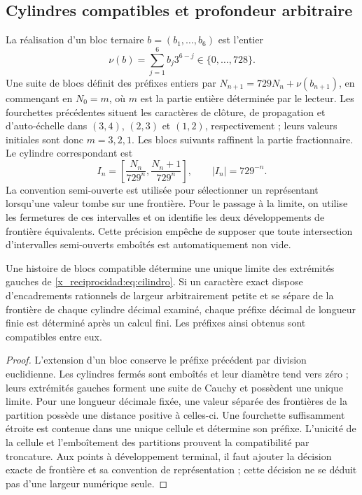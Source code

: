 

\subsection{Cylindres compatibles et profondeur arbitraire}

La réalisation d'un bloc ternaire \(b=(b_1,\ldots,b_6)\) est l'entier
\[
 \nu(b)=\sum_{j=1}^6b_j3^{6-j}\in\{0,\ldots,728\}.
\]
Une suite de blocs définit des préfixes entiers par \(N_{n+1}=729N_n+\nu(b_{n+1})\), en commençant en \(N_0=m\), où \(m\) est la partie entière déterminée par le lecteur. Les fourchettes précédentes situent les caractères de clôture, de propagation et d'auto-échelle dans \((3,4)\), \((2,3)\) et \((1,2)\), respectivement ; leurs valeurs initiales sont donc \(m=3,2,1\). Les blocs suivants raffinent la partie fractionnaire. Le cylindre correspondant est
\begin{equation}
 I_n=\left[\frac{N_n}{729^n},\frac{N_n+1}{729^n}\right],
 \qquad |I_n|=729^{-n}.
 \label{x_reciprocidad:eq:cilindro}
\end{equation}
La convention semi-ouverte est utilisée pour sélectionner un représentant lorsqu'une valeur tombe sur une frontière. Pour le passage à la limite, on utilise les fermetures de ces intervalles et on identifie les deux développements de frontière équivalents. Cette précision empêche de supposer que toute intersection d'intervalles semi-ouverts emboîtés est automatiquement non vide.

\begin{theorem}
Une histoire de blocs compatible détermine une unique limite des extrémités gauches de \eqref{x_reciprocidad:eq:cilindro}. Si un caractère exact dispose d'encadrements rationnels de largeur arbitrairement petite et se sépare de la frontière de chaque cylindre décimal examiné, chaque préfixe décimal de longueur finie est déterminé après un calcul fini. Les préfixes ainsi obtenus sont compatibles entre eux.
\end{theorem}
\begin{proof}
L'extension d'un bloc conserve le préfixe précédent par division euclidienne. Les cylindres fermés sont emboîtés et leur diamètre tend vers zéro ; leurs extrémités gauches forment une suite de Cauchy et possèdent une unique limite. Pour une longueur décimale fixée, une valeur séparée des frontières de la partition possède une distance positive à celles-ci. Une fourchette suffisamment étroite est contenue dans une unique cellule et détermine son préfixe. L'unicité de la cellule et l'emboîtement des partitions prouvent la compatibilité par troncature. Aux points à développement terminal, il faut ajouter la décision exacte de frontière et sa convention de représentation ; cette décision ne se déduit pas d'une largeur numérique seule.
\end{proof}

